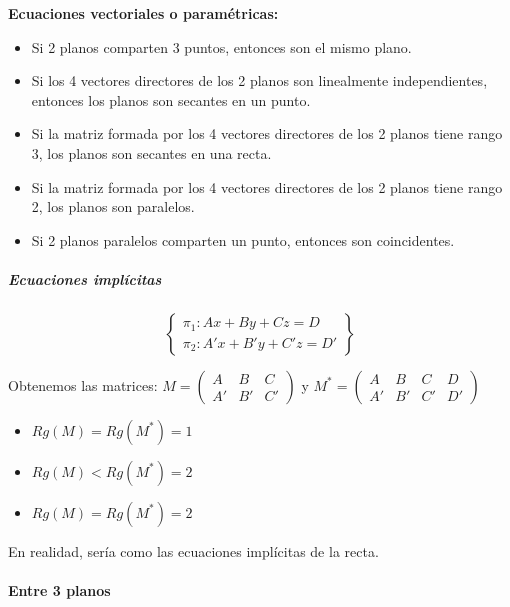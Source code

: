 \begin{framed}
\textbf{Ecuaciones vectoriales o paramétricas:}
  \begin{itemize}
    \item Si 2 planos comparten 3 puntos, entonces son el mismo plano.
    \item Si los 4 vectores directores de los 2 planos son linealmente independientes, entonces los planos son secantes en un punto.
    \item Si la matriz formada por los 4 vectores directores de los 2 planos tiene rango 3, los planos son secantes en una recta.
    \item Si la matriz formada por los 4 vectores directores de los 2 planos tiene rango 2, los planos son paralelos.
    \item Si 2 planos paralelos comparten un punto, entonces son coincidentes.
  \end{itemize}
\end{framed}



\subparagraph{Ecuaciones implícitas}

\[
\left\{\begin{array}{c}
\pi_1: Ax+By+Cz = D\\
\pi_2: A'x+B'y+C'z = D'
\end{array}\right\}
\]

Obtenemos las matrices: $M = \displaystyle\begin{pmatrix}A&B&C\\A'&B'&C'\end{pmatrix}$ y $M^* = \displaystyle\begin{pmatrix}A&B&C&D\\A'&B'&C'&D'\end{pmatrix}$

\begin{framed}
  \begin{itemize}
    \item $Rg(M) = Rg(M^*) = 1 $
    \item $Rg(M) < Rg(M^*) = 2 $
    \item $Rg(M) = Rg(M^*) = 2 $
  \end{itemize}
\obs En realidad, sería como las ecuaciones implícitas de la recta.
\end{framed}

\paragraph{Entre 3 planos}

